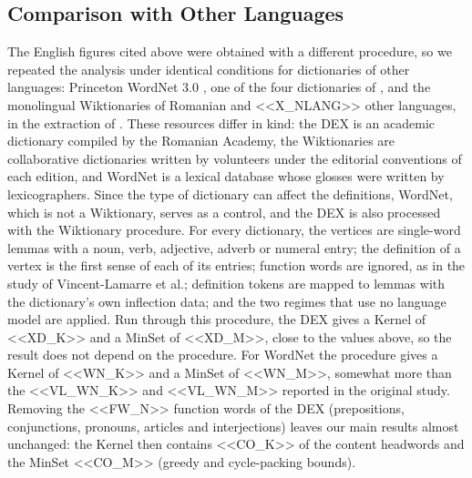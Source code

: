 \documentclass[11pt]{article}
\begin{document}
\subsection{Comparison with Other Languages}
The English figures cited above were obtained with a different procedure, so we repeated the analysis under identical conditions for dictionaries of other languages: Princeton WordNet 3.0 \cite{miller1995}, one of the four dictionaries of , and the monolingual Wiktionaries of Romanian and <<X_NLANG>> other languages, in the extraction of . These resources differ in kind: the DEX is an academic dictionary compiled by the Romanian Academy, the Wiktionaries are collaborative dictionaries written by volunteers under the editorial conventions of each edition, and WordNet is a lexical database whose glosses were written by lexicographers. Since the type of dictionary can affect the definitions, WordNet, which is not a Wiktionary, serves as a control, and the DEX is also processed with the Wiktionary procedure. For every dictionary, the vertices are single-word lemmas with a noun, verb, adjective, adverb or numeral entry; the definition of a vertex is the first sense of each of its entries; function words are ignored, as in the study of Vincent-Lamarre et al.; definition tokens are mapped to lemmas with the dictionary's own inflection data; and the two regimes that use no language model are applied. Run through this procedure, the DEX gives a Kernel of <<XD_K>> and a MinSet of <<XD_M>>, close to the values above, so the result does not depend on the procedure. For WordNet the procedure gives a Kernel of <<WN_K>> and a MinSet of <<WN_M>>, somewhat more than the <<VL_WN_K>> and <<VL_WN_M>> reported in the original study. Removing the <<FW_N>> function words of the DEX (prepositions, conjunctions, pronouns, articles and interjections) leaves our main results almost unchanged: the Kernel then contains <<CO_K>> of the content headwords and the MinSet <<CO_M>> (greedy and cycle-packing bounds).
\end{document}
